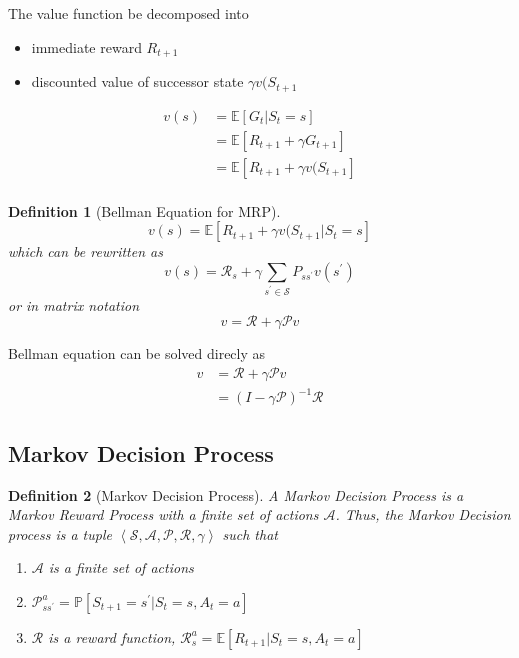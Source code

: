 \documentclass[a4paper,10pt]{article}
\newtheorem{defn}{Definition}
\begin{document}
The value function be decomposed into
\begin{itemize}
 \item immediate reward $R_{t+1}$
 \item discounted value of successor state $\gamma v(S_{t+1}$
\end{itemize}

\begin{align*}
v(s) &= \mathbb{E} \left[ G_t | S_t = s \right] \\
&= \mathbb{E} \left[ R_{t+1} + \gamma G_{t+1} \right] \\
&= \mathbb{E} \left[ R_{t+1} + \gamma v(S_{t+1} \right] \\
\end{align*}

\begin{defn}[Bellman Equation for MRP]
 $$
 v(s) = \mathbb{E} \left[ R_{t+1} + \gamma v(S_{t+1} | S_t = s \right]
 $$
 which can be rewritten as
 $$
 v(s) = \mathcal{R}_s + \gamma \sum_{s^\prime \in \mathcal{S}} P_{s s^\prime} v(s^\prime)
 $$
 or in matrix notation
 $$
 v = \mathcal{R} + \gamma \mathcal{P} v
 $$
\end{defn}


Bellman equation can be solved direcly as
\begin{align*}
 v &= \mathcal{R} + \gamma \mathcal{P} v \\
   &= (I - \gamma \mathcal{P})^{-1} \mathcal{R}
\end{align*}


\subsection{Markov Decision Process}

\begin{defn}[Markov Decision Process]
A Markov Decision Process is a Markov Reward Process with a finite set of actions $\mathcal{A}$. Thus, the Markov Decision process is a tuple $\left< \mathcal{S}, \mathcal{A}, \mathcal{P}, \mathcal{R}, \gamma \right>$ such that
\begin{enumerate}
 \item $\mathcal{A}$ is a finite set of actions
 \item $\mathcal{P}_{s s^\prime}^a = \mathbb{P} \left[ S_{t+1} = s^\prime | S_t = s, A_t = a \right]$
 \item $\mathcal{R}$ is a reward function, $\mathcal{R}_s^a = \mathbb{E} \left[ R_{t+1} | S_t = s, A_t = a \right]$
\end{enumerate}
\end{defn}
\end{document}

